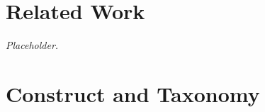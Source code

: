 \documentclass{article}
\begin{document}
\section{Related Work}
\label{sec:related}
\emph{Placeholder.}

\section{Construct and Taxonomy}
\label{sec:taxonomy}
\end{document}
